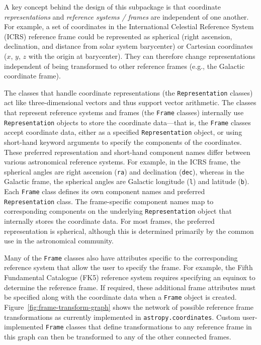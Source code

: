 \documentclass[modern]{aastex61}
\renewcommand{\figurename}{Figure\xspace}
\begin{document}
A key concept behind the design of this subpackage is that coordinate
\textit{representations} and \textit{reference systems / frames} are independent
of one another.
For example, a set of coordinates in the International Celestial Reference
System (ICRS) reference frame could be represented as spherical (right
ascension, declination, and distance from solar system barycenter) or Cartesian
coordinates ($x$, $y$, $z$ with the origin at barycenter).
They can therefore change representations independent of being transformed to
other reference frames (e.g., the Galactic coordinate frame).

The classes that handle coordinate representations (the \texttt{Representation}
classes) act like three-dimensional vectors and thus support vector arithmetic.
The classes that represent reference systems and frames (the \texttt{Frame}
classes) internally use \texttt{Representation} objects to store the coordinate
data---that is, the \texttt{Frame} classes accept coordinate data, either as a
specified \texttt{Representation} object, or using short-hand keyword arguments
to specify the components of the coordinates.
These preferred representation and short-hand component names differ between
various astronomical reference systems.
For example, in the ICRS frame, the spherical angles are right ascension
(\texttt{ra}) and declination (\texttt{dec}), whereas in the Galactic frame, the
spherical angles are Galactic longitude (\texttt{l}) and latitude (\texttt{b}).
Each \texttt{Frame} class defines its own component names and preferred \texttt{Representation} class.
The frame-specific component names map to corresponding components on the
underlying \texttt{Representation} object that internally stores the coordinate
data.
For most frames, the preferred representation is spherical, although this is
determined primarily by the common use in the astronomical community.

Many of the \texttt{Frame} classes also have attributes specific to the
corresponding reference system that allow the user to specify the frame.
For example, the Fifth Fundamental Catalogue (FK5) reference system requires
specifying an equinox to determine the reference frame.
If required, these additional frame attributes must be specified along with the
coordinate data when a \texttt{Frame} object is created.
\figurename~\ref{fig:frame-transform-graph} shows the network of possible
reference frame transformations as currently implemented in
\texttt{astropy.coordinates}.
Custom user-implemented \texttt{Frame} classes that define transformations to
any reference frame in this graph can then be transformed to any of the other
connected frames.
\end{document}
